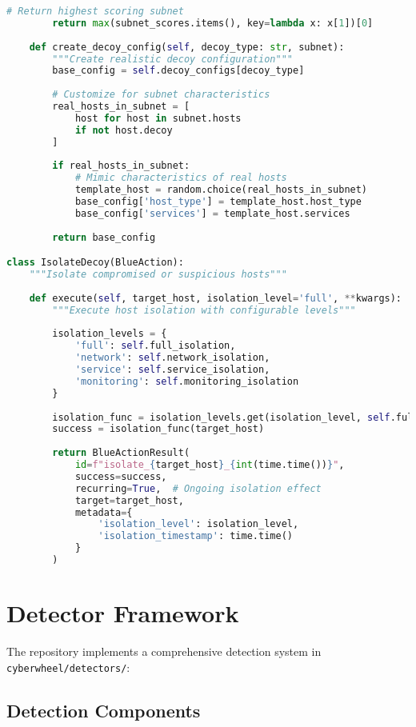\documentclass[12pt,a4paper]{article}
\begin{document}
\begin{lstlisting}[language=Python, caption=Blue Action Implementation Example]
        # Return highest scoring subnet
        return max(subnet_scores.items(), key=lambda x: x[1])[0]
    
    def create_decoy_config(self, decoy_type: str, subnet):
        """Create realistic decoy configuration"""
        base_config = self.decoy_configs[decoy_type]
        
        # Customize for subnet characteristics
        real_hosts_in_subnet = [
            host for host in subnet.hosts 
            if not host.decoy
        ]
        
        if real_hosts_in_subnet:
            # Mimic characteristics of real hosts
            template_host = random.choice(real_hosts_in_subnet)
            base_config['host_type'] = template_host.host_type
            base_config['services'] = template_host.services
        
        return base_config

class IsolateDecoy(BlueAction):
    """Isolate compromised or suspicious hosts"""
    
    def execute(self, target_host, isolation_level='full', **kwargs):
        """Execute host isolation with configurable levels"""
        
        isolation_levels = {
            'full': self.full_isolation,
            'network': self.network_isolation, 
            'service': self.service_isolation,
            'monitoring': self.monitoring_isolation
        }
        
        isolation_func = isolation_levels.get(isolation_level, self.full_isolation)
        success = isolation_func(target_host)
        
        return BlueActionResult(
            id=f"isolate_{target_host}_{int(time.time())}",
            success=success,
            recurring=True,  # Ongoing isolation effect
            target=target_host,
            metadata={
                'isolation_level': isolation_level,
                'isolation_timestamp': time.time()
            }
        )
\end{lstlisting}

\section{Detector Framework}

The repository implements a comprehensive detection system in \texttt{cyberwheel/detectors/}:

\subsection{Detection Components}
\end{document}
